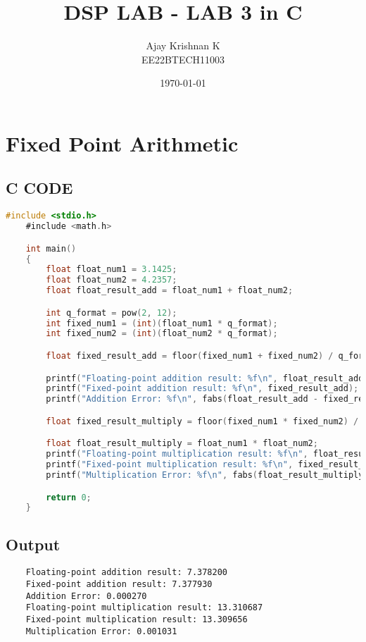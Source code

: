\documentclass[a4paper,12pt]{article}
\title{\textbf{DSP LAB - LAB 3 in C}}
\author{Ajay Krishnan K \\ EE22BTECH11003}
\date{\today}
\begin{document}
\maketitle

\section{Fixed Point Arithmetic}

\subsection{C CODE}

\begin{lstlisting}[language=C]
    #include <stdio.h>
    #include <math.h>

    int main()
    {
        float float_num1 = 3.1425;
        float float_num2 = 4.2357;
        float float_result_add = float_num1 + float_num2;

        int q_format = pow(2, 12);
        int fixed_num1 = (int)(float_num1 * q_format);
        int fixed_num2 = (int)(float_num2 * q_format);

        float fixed_result_add = floor(fixed_num1 + fixed_num2) / q_format;

        printf("Floating-point addition result: %f\n", float_result_add);
        printf("Fixed-point addition result: %f\n", fixed_result_add);
        printf("Addition Error: %f\n", fabs(float_result_add - fixed_result_add));

        float fixed_result_multiply = floor(fixed_num1 * fixed_num2) / pow(q_format, 2);

        float float_result_multiply = float_num1 * float_num2;
        printf("Floating-point multiplication result: %f\n", float_result_multiply);
        printf("Fixed-point multiplication result: %f\n", fixed_result_multiply);
        printf("Multiplication Error: %f\n", fabs(float_result_multiply - fixed_result_multiply));

        return 0;
    }
\end{lstlisting}

\subsection{Output}

\begin{lstlisting}
    Floating-point addition result: 7.378200
    Fixed-point addition result: 7.377930
    Addition Error: 0.000270
    Floating-point multiplication result: 13.310687
    Fixed-point multiplication result: 13.309656
    Multiplication Error: 0.001031
\end{lstlisting}
\end{document}
